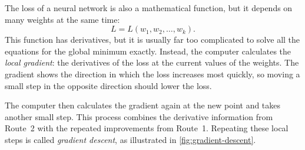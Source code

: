 \documentclass[12pt]{article}
\begin{document}
The loss of a neural network is also a mathematical function, but it depends on many weights at the same time:
\[
    L=L(w_1,w_2,\ldots,w_k).
\]
This function has derivatives, but it is usually far too complicated to solve all the equations for the global minimum exactly. Instead, the computer calculates the \emph{local gradient}: the derivatives of the loss at the current values of the weights. The gradient shows the direction in which the loss increases most quickly, so moving a small step in the opposite direction should lower the loss.

The computer then calculates the gradient again at the new point and takes another small step. This process combines the derivative information from Route~2 with the repeated improvements from Route~1. Repeating these local steps is called \emph{gradient descent}, as illustrated in \cref{fig:gradient-descent}.
\end{document}
